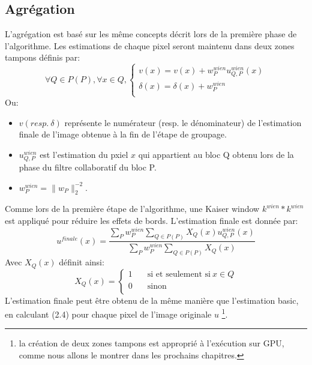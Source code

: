 \subsection{Agrégation}
L'agrégation est basé sur les même concepts décrit lors de la première phase de l'algorithme. Les estimations de chaque pixel seront maintenu dans deux zones tampons définis par:
\[ \forall Q \in  P(P), \forall x \in Q, 
  \begin{cases}
    v(x) = v(x) + w^{wien}_P u^{wien}_{Q,P}(x) \\
    \delta(x) = \delta(x) + w^{wien}_P  \\
  \end{cases}
\]
Ou:
\begin{itemize}
\item \(v (resp. \: \delta ) \) représente le numérateur (resp. le dénominateur) de l'estimation finale de l'image obtenue à la fin de l'étape de groupage.
\item \(u^{wien}_{Q,P} \) est l'estimation du pxiel \(x \) qui appartient au bloc Q obtenu lors de la phase du filtre collaboratif du bloc P.
\item \( w^{wien}_P  = \parallel w_P \parallel^{-2}_2 \). 
\end{itemize}
Comme lors de la première étape de l'algorithme, une Kaiser window \(k^{wien} * k^{wien}\) est appliqué pour réduire les effets de bords. L'estimation finale est donnée par:
\begin{equation}
u^{finale}(x) = \frac{\displaystyle\sum_{P}w^{wien}_P \displaystyle\sum_{Q \in P(P)}X_Q(x)u^{wien}_{Q,P}(x)}{\displaystyle\sum_{P}w^{wien}_P \displaystyle\sum_{Q \in P(P)}X_Q(x)}
\end{equation}
Avec \(X_Q(x)\) définit ainsi:
\[ X_Q(x) =
  \begin{cases}
    1       & \quad \text{si et seulement si} \: x  \in Q \\
    0       & \quad \text{sinon}\\
  \end{cases}
\]
L'estimation finale peut être obtenu de la même manière que l'estimation basic, en calculant (2.4) pour chaque pixel de l'image originale \(u\) \footnote{la création de deux zones tampons est approprié à l'exécution sur GPU, comme nous allons le montrer dans les prochains chapitres.}. 